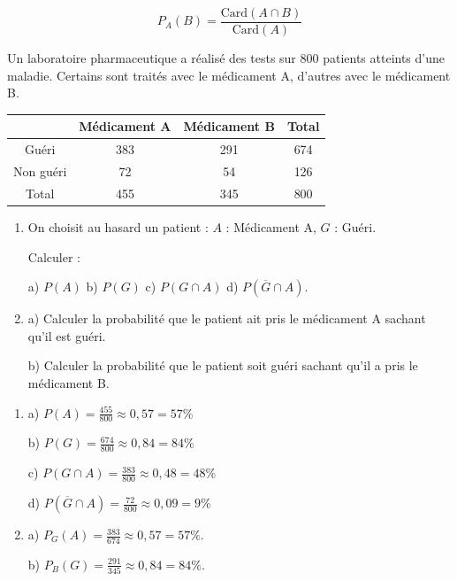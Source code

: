 \begin{propriete}
	$$
		P_A(B) = \frac{\text{Card}(A \cap B)}{\text{Card}(A)}
	$$
\end{propriete}

\begin{methode}
	Un laboratoire pharmaceutique a réalisé des tests sur 800 patients atteints d'une maladie. Certains sont traités avec le médicament A, d'autres avec le médicament B.
	\begin{center}
		\begin{tabular}{|c|c|c|c|} \hline
			          & Médicament A & Médicament B & Total \\ \hline
			Guéri     & 383          & 291          & 674   \\ \hline
			Non guéri & 72           & 54           & 126   \\ \hline
			Total     & 455          & 345          & 800   \\ \hline
		\end{tabular}
	\end{center}
	\begin{enumerate}
		\item On choisit au hasard un patient : $A$ : \og{}Médicament A\fg{}, $G$ : \og{}Guéri\fg{}.

		      Calculer :

		      a) $P(A)$ \quad b) $P(G)$ \quad c) $P(G \cap A)$ \quad d) $P(\overline{G} \cap A)$.

		\item a) Calculer la probabilité que le patient ait pris le médicament A sachant qu'il est guéri.

		      b) Calculer la probabilité que le patient soit guéri sachant qu'il a pris le médicament B.
	\end{enumerate}
\end{methode}

\begin{correction}
	\begin{enumerate}
		\item
		      a) $P(A) = \frac{455}{800} \approx 0,57 = 57\%$

		      b) $P(G) = \frac{674}{800} \approx 0,84 = 84\%$

		      c) $P(G \cap A) = \frac{383}{800} \approx 0,48 = 48\%$

		      d) $P(\overline{G} \cap A) = \frac{72}{800} \approx 0,09 = 9\%$
		\item
		      a) $P_G(A) = \frac{383}{674} \approx 0,57 = 57\%$.

		      b) $P_B(G) = \frac{291}{345} \approx 0,84 = 84\%$.
	\end{enumerate}
\end{correction}
